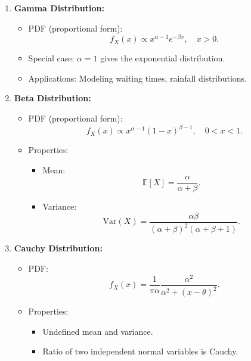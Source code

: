 \documentclass{article}
\begin{document}
\begin{itemize}
\begin{enumerate}
      \item \textbf{Gamma Distribution:}
        \begin{itemize}
          \item PDF (proportional form):
            \[
              f_X(x) \propto x^{\alpha - 1} e^{-\beta x}, \quad x > 0.
            \]
          \item Special case: $\alpha = 1$ gives the exponential distribution.
          \item Applications: Modeling waiting times, rainfall distributions.
        \end{itemize}

      \item \textbf{Beta Distribution:}
        \begin{itemize}
          \item PDF (proportional form):
            \[
              f_X(x) \propto x^{\alpha - 1}(1-x)^{\beta - 1}, \quad 0 < x < 1.
            \]
          \item Properties:
            \begin{itemize}
              \item Mean:
                \[
                  \mathbb{E}[X] = \frac{\alpha}{\alpha + \beta}.
                \]
              \item Variance:
                \[
                  \text{Var}(X) = \frac{\alpha \beta}{(\alpha + \beta)^2 (\alpha + \beta + 1)}.
                \]
            \end{itemize}
        \end{itemize}

      \item \textbf{Cauchy Distribution:}
        \begin{itemize}
          \item PDF:
            \[
              f_X(x) = \frac{1}{\pi \alpha} \frac{\alpha^2}{\alpha^2 + (x-\theta)^2}.
            \]
          \item Properties:
            \begin{itemize}
              \item Undefined mean and variance.
              \item Ratio of two independent normal variables is Cauchy.
            \end{itemize}
        \end{itemize}
    \end{enumerate}


\end{itemize}
\end{document}
